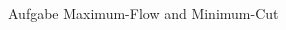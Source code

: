 \begin{frame}[allowframebreaks]{Aufgabe \thesection}{Maximum-Flow and Minimum-Cut}
\begin{solutionnoinc}
\begin{columns}
      \begin{column}{0.5\textwidth}
      \end{column}
      \begin{column}{0.5\textwidth}
      \end{column}
    \end{columns}
  \end{solutionnoinc}
  \begin{solutionnoinc}
    \begin{columns}
      \begin{column}{0.5\textwidth}
      \end{column}
      \begin{column}{0.5\textwidth}
      \end{column}
    \end{columns}
  \end{solutionnoinc}
  \begin{solution}
    \begin{columns}
      \begin{column}{0.5\textwidth}
      \end{column}
      \begin{column}{0.5\textwidth}
      \end{column}
    \end{columns}

\end{solution}
\end{frame}
